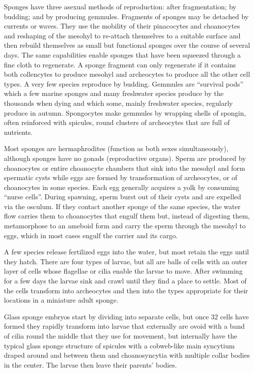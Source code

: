 \documentclass[]{book}
\theoremstyle{definition}
\theoremstyle{definition}
\theoremstyle{definition}
\theoremstyle{remark}
\begin{document}
Sponges have three asexual methods of reproduction: after fragmentation;
by budding; and by producing gemmules. Fragments of sponges may be
detached by currents or waves. They use the mobility of their
pinacocytes and choanocytes and reshaping of the mesohyl to re-attach
themselves to a suitable surface and then rebuild themselves as small
but functional sponges over the course of several days. The same
capabilities enable sponges that have been squeezed through a fine cloth
to regenerate. A sponge fragment can only regenerate if it contains both
collencytes to produce mesohyl and archeocytes to produce all the other
cell types. A very few species reproduce by budding. Gemmules are
``survival pods'' which a few marine sponges and many freshwater species
produce by the thousands when dying and which some, mainly freshwater
species, regularly produce in autumn. Spongocytes make gemmules by
wrapping shells of spongin, often reinforced with spicules, round
clusters of archeocytes that are full of nutrients.

Most sponges are hermaphrodites (function as both sexes simultaneously),
although sponges have no gonads (reproductive organs). Sperm are
produced by choanocytes or entire choanocyte chambers that sink into the
mesohyl and form spermatic cysts while eggs are formed by transformation
of archeocytes, or of choanocytes in some species. Each egg generally
acquires a yolk by consuming ``nurse cells''. During spawning, sperm
burst out of their cysts and are expelled via the osculum. If they
contact another sponge of the same species, the water flow carries them
to choanocytes that engulf them but, instead of digesting them,
metamorphose to an ameboid form and carry the sperm through the mesohyl
to eggs, which in most cases engulf the carrier and its cargo.

A few species release fertilized eggs into the water, but most retain
the eggs until they hatch. There are four types of larvae, but all are
balls of cells with an outer layer of cells whose flagellae or cilia
enable the larvae to move. After swimming for a few days the larvae sink
and crawl until they find a place to settle. Most of the cells transform
into archeocytes and then into the types appropriate for their locations
in a miniature adult sponge.

Glass sponge embryos start by dividing into separate cells, but once 32
cells have formed they rapidly transform into larvae that externally are
ovoid with a band of cilia round the middle that they use for movement,
but internally have the typical glass sponge structure of spicules with
a cobweb-like main syncytium draped around and between them and
choanosyncytia with multiple collar bodies in the center. The larvae
then leave their parents' bodies.
\end{document}
